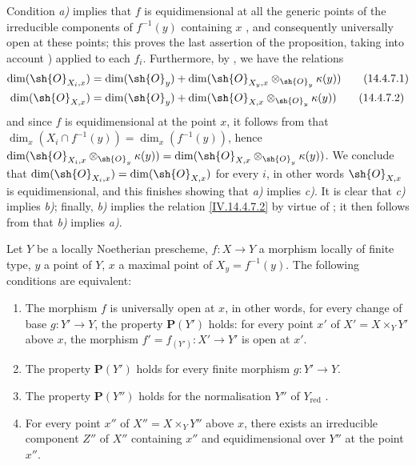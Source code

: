 Condition \emph{a)} implies that $f$ is equidimensional at all the generic points of the irreducible components of $f^{-1}(y)$ containing $x$ , and consequently  universally open at these points; this proves the last assertion of the proposition, taking into account ) applied to each $f_i$.
Furthermore, by , we have the relations
\begin{align}
  \dim(\sh{O}_{X_i,x}) &= \dim(\sh{O}_y) + \dim(\sh{O}_{X_y,x}\otimes_{\sh{O}_y}\kappa(y))
  \tag{14.4.7.1}\label{IV.14.4.7.1}\\
  \dim(\sh{O}_{X,x}) &= \dim(\sh{O}_y) + \dim(\sh{O}_{X,x}\otimes_{\sh{O}_y}\kappa(y))
  \tag{14.4.7.2}\label{IV.14.4.7.2}
\end{align}
and since $f$ is equidimensional at the point $x$, it follows from  that $\dim_x(X_i\cap f^{-1}(y))=\dim_x(f^{-1}(y))$, hence  $\dim(\sh{O}_{X_i,x}\otimes_{\sh{O}_y}\kappa(y))=\dim(\sh{O}_{X,x}\otimes_{\sh{O}_y}\kappa(y))$.
We conclude that $\dim(\sh{O}_{X_i,x})=\dim(\sh{O}_{X,x})$ for every $i$, in other words $\sh{O}_{X,x}$ is equidimensional, and this finishes showing that \emph{a)} implies \emph{c)}.
It is clear that \emph{c)} implies \emph{b)}; finally, \emph{b)} implies the relation \eqref{IV.14.4.7.2} by virtue of ; it then follows from  that \emph{b)} implies \emph{a)}.

\begin{proposition}[14.4.8]
\label{IV.14.4.8}
Let $Y$ be a locally Noetherian prescheme, $f:X\to Y$ a morphism locally of finite type, $y$ a point of $Y$, $x$ a maximal point of $X_y=f^{-1}(y)$.
The following conditions are equivalent:
\begin{enumerate}[label=\emph{\alph*)}]
  \item The morphism $f$ is universally open at $x$, in other words, for every change of base $g:Y'\to Y$, the property $\mathbf{P}(Y')$ holds: for every point $x'$ of $X'=X\times_Y Y'$ above $x$, the morphism $f'=f_{(Y')}:X'\to Y'$ is open at $x'$.
  \item[\emph{a$'$)}] The property $\mathbf{P}(Y')$ holds for every finite morphism $g:Y'\to Y$.
  \item[\emph{a$''$)}] The property $\mathbf{P}(Y'')$ holds for the normalisation $Y''$ of $Y_{\mathrm{red}}$ .
  \item For every point $x''$ of $X''=X\times_Y Y''$ above $x$, there exists an irreducible component $Z''$ of $X''$ containing $x''$ and equidimensional over $Y''$ at the point $x''$.
\end{enumerate}
\end{proposition}

